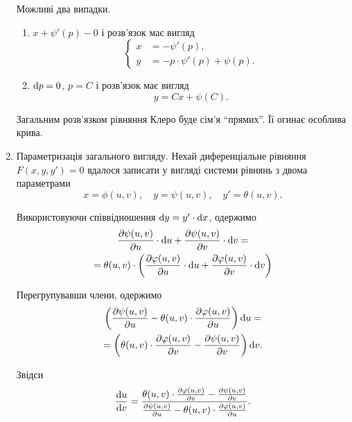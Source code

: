 \begin{enumerate}
	Можливі два випадки.
	\begin{enumerate}
		\item $x + \psi'(p) - 0$ і розв'язок має вигляд
		\begin{equation*}
			\left\{
				\begin{aligned}
					x &= - \psi'(p), \\
					y &= -p \cdot \psi'(p) + \psi(p).
				\end{aligned}
			\right.
		\end{equation*}
		
		\item $\mathop{}\!\mathrm{d} p = 0$, $p = C$ і розв'язок має вигляд
		\begin{equation*}
			y = C x + \psi(C).
		\end{equation*}
	\end{enumerate}
	
	Загальним розв'язком рівняння Клеро буде сім'я ``прямих''. Її огинає особлива крива.
	
	\item Параметризація загального вигляду. Нехай диференціальне рівняння $F(x, y, y') = 0$ вдалося записати у вигляді системи рівнянь з двома параметрами
	\begin{equation*}
		x = \phi(u, v), \quad y = \psi(u, v), \quad y' = \theta(u, v).	
	\end{equation*}
	
	Використовуючи співвідношення $\mathop{}\!\mathrm{d} y = y' \cdot \mathop{}\!\mathrm{d} x$, одержимо
	\begin{multline*}
		\frac{\partial \psi(u,v)}{\partial u} \cdot \mathop{}\!\mathrm{d} u + \frac{\partial \psi(u, v)}{\partial v} \cdot \mathop{}\!\mathrm{d} v = \\
		= \theta(u,v) \cdot \left( \frac{\partial \varphi(u,v)}{\partial u} \cdot \mathop{}\!\mathrm{d} u + \frac{\partial \varphi(u, v)}{\partial v} \cdot \mathop{}\!\mathrm{d} v\right)
	\end{multline*}
	
	Перегрупувавши члени, одержимо
	\begin{multline*}
		\left( \frac{\partial \psi(u,v)}{\partial u} - \theta(u, v) \cdot \frac{\partial \varphi(u,v)}{\partial u} \right) \mathop{}\!\mathrm{d} u = \\
		= \left( \theta(u,v) \cdot \frac{\partial \varphi(u, v)}{\partial v} - \frac{\partial \psi(u, v)}{\partial v} \right) \mathop{}\!\mathrm{d} v.
	\end{multline*}
	
	Звідси
	\begin{equation*}
		\frac{\mathop{}\!\mathrm{d} u}{\mathop{}\!\mathrm{d} v} = \frac{\theta(u,v) \cdot \frac{\partial \varphi(u, v)}{\partial v} - \frac{\partial \psi(u, v)}{\partial v}}{\frac{\partial \psi(u,v)}{\partial u} - \theta(u, v) \cdot \frac{\partial \varphi(u,v)}{\partial u}}.
	\end{equation*}


\end{enumerate}
